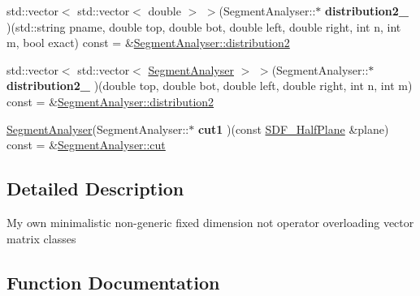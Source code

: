 \begin{DoxyCompactItemize}
\item 
\mbox{\label{namespaceCPlantBox_a37420602b1ee04030243a935bfac2191}} 
std\+::vector$<$ std\+::vector$<$ double $>$ $>$(Segment\+Analyser\+::$\ast$ {\bfseries distribution2\+\_} )(std\+::string pname, double top, double bot, double left, double right, int n, int m, bool exact) const = \&\hyperlink{classCPlantBox_1_1SegmentAnalyser_a45dc325035b8e48fc86a8aed7d4bab16}{Segment\+Analyser\+::distribution2}
\item 
\mbox{\label{namespaceCPlantBox_a6e0fb610343d5a2bfb8d7c5a22eb974d}} 
std\+::vector$<$ std\+::vector$<$ \hyperlink{classCPlantBox_1_1SegmentAnalyser}{Segment\+Analyser} $>$ $>$(Segment\+Analyser\+::$\ast$ {\bfseries distribution2\+\_} )(double top, double bot, double left, double right, int n, int m) const = \&\hyperlink{classCPlantBox_1_1SegmentAnalyser_a45dc325035b8e48fc86a8aed7d4bab16}{Segment\+Analyser\+::distribution2}
\item 
\mbox{\label{namespaceCPlantBox_ad110e4d5c9686ab311e6a8045dd8281d}} 
\hyperlink{classCPlantBox_1_1SegmentAnalyser}{Segment\+Analyser}(Segment\+Analyser\+::$\ast$ {\bfseries cut1} )(const \hyperlink{classCPlantBox_1_1SDF__HalfPlane}{S\+D\+F\+\_\+\+Half\+Plane} \&plane) const = \&\hyperlink{classCPlantBox_1_1SegmentAnalyser_a777f3abc5ed7a351ca228e1bf7da0957}{Segment\+Analyser\+::cut}
\end{DoxyCompactItemize}


\subsection{Detailed Description}
My own minimalistic non-\/generic fixed dimension not operator overloading vector matrix classes 

\subsection{Function Documentation}
\mbox{\label{namespaceCPlantBox_a514e67aca132b8cd62c205379bb605f7}} 
